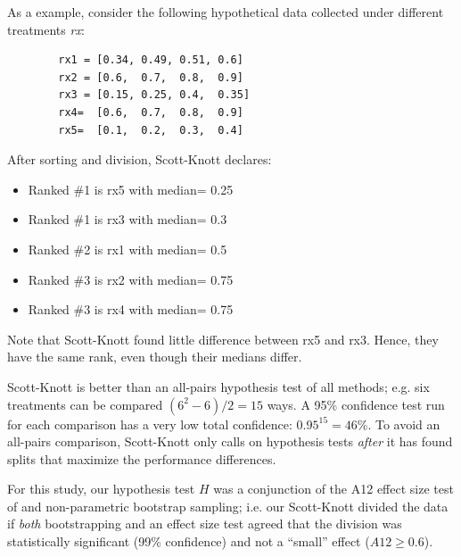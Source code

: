 \documentclass[conference]{IEEEtran}
\newcommand{\bi}{\begin{itemize}}
\newcommand{\ei}{\end{itemize}}
\begin{document}
	As a example, consider the following hypothetical data collected under different treatments {\em rx}:
	
	{\scriptsize \begin{verbatim}
		rx1 = [0.34, 0.49, 0.51, 0.6]
		rx2 = [0.6,  0.7,  0.8,  0.9]
		rx3 = [0.15, 0.25, 0.4,  0.35]
		rx4=  [0.6,  0.7,  0.8,  0.9]
		rx5=  [0.1,  0.2,  0.3,  0.4]
		\end{verbatim}}
	\noindent
	After sorting and division, Scott-Knott declares:
	\bi
	\item Ranked \#1 is rx5 with median= 0.25
	\item Ranked \#1 is rx3 with median= 0.3
	\item Ranked \#2 is rx1 with median= 0.5
	\item Ranked \#3 is rx2 with median= 0.75
	\item Ranked \#3 is rx4 with median= 0.75
	\ei
	Note that Scott-Knott found  little
	difference between rx5 and rx3. Hence,
	they have the same rank, even though their medians differ.
	
	Scott-Knott is better than an 
	all-pairs hypothesis test of all methods; e.g. six treatments
	can be compared \mbox{$(6^2-6)/2=15$} ways. 
	A 95\% confidence test run for each comparison has  a very low total confidence: 
	\mbox{$0.95^{15} = 46$}\%.
	To avoid an all-pairs comparison, Scott-Knott only calls on hypothesis
	tests {\em after} it has found splits that maximize the performance differences.
	
	For this study, our hypothesis test $H$ was a
	conjunction of the A12 effect size test of  and
	non-parametric bootstrap sampling; i.e. our
	Scott-Knott divided the data if {\em both}
	bootstrapping and an effect size test agreed that
	the division was statistically significant (99\%
	confidence) and not a ``small'' effect ($A12 \ge
	0.6$).
	
\end{document}
